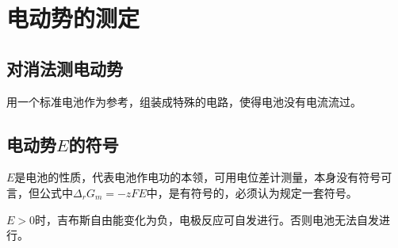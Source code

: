 \section{电动势的测定}


\subsection{对消法测电动势}

用一个标准电池作为参考，组装成特殊的电路，使得电池没有电流流过。


\subsection{电动势$E$的符号}

$E$是电池的性质，代表电池作电功的本领，可用电位差计测量，本身没有符号可言，但公式中$\Delta_r G_m = -zFE$中，是有符号的，必须认为规定一套符号。

$E > 0$时，吉布斯自由能变化为负，电极反应可自发进行。否则电池无法自发进行。
